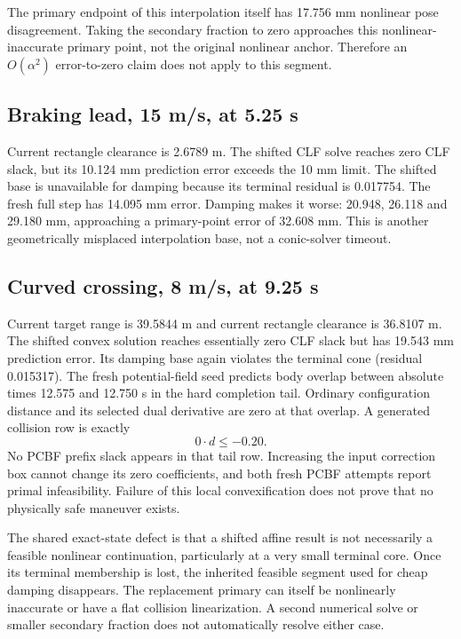 \documentclass[11pt]{article}
\begin{document}
The primary endpoint of this interpolation itself has 17.756 mm nonlinear
pose disagreement. Taking the secondary fraction to zero approaches this
nonlinear-inaccurate primary point, not the original nonlinear anchor.
Therefore an $O(\alpha^2)$ error-to-zero claim does not apply to this segment.

\subsection{Braking lead, 15 m/s, at 5.25 s}
Current rectangle clearance is 2.6789 m. The shifted CLF solve reaches zero CLF
slack, but its 10.124 mm prediction error exceeds the 10 mm limit. The shifted
base is unavailable for damping because its terminal residual is 0.017754.
The fresh full step has 14.095 mm error. Damping makes it worse: 20.948,
26.118 and 29.180 mm, approaching a primary-point error of 32.608 mm. This is
another geometrically misplaced interpolation base, not a conic-solver timeout.

\subsection{Curved crossing, 8 m/s, at 9.25 s}
Current target range is 39.5844 m and current rectangle clearance is 36.8107 m.
The shifted convex solution reaches essentially zero CLF slack but has
19.543 mm prediction error. Its damping base again violates the terminal cone
(residual 0.015317). The fresh potential-field seed predicts body overlap
between absolute times 12.575 and 12.750 s in the hard completion tail.
Ordinary configuration distance and its selected dual derivative are zero at
that overlap. A generated collision row is exactly
\[
 0\cdot d\le-0.20.
\]
No PCBF prefix slack appears in that tail row. Increasing the input correction
box cannot change its zero coefficients, and both fresh PCBF attempts report
primal infeasibility. Failure of this local convexification does not prove
that no physically safe maneuver exists.

The shared exact-state defect is that a shifted affine result is not necessarily
a feasible nonlinear continuation, particularly at a very small terminal core.
Once its terminal membership is lost, the inherited feasible segment used for
cheap damping disappears. The replacement primary can itself be nonlinearly
inaccurate or have a flat collision linearization. A second numerical solve or
smaller secondary fraction does not automatically resolve either case.
\end{document}
